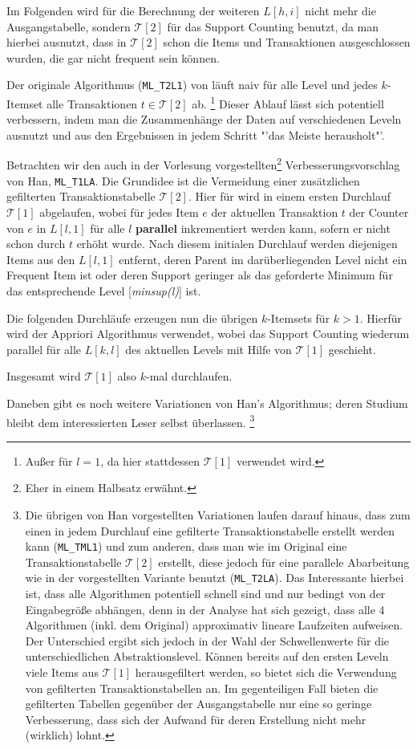 Im Folgenden wird für die Berechnung der weiteren \(L[h,i]\) nicht mehr die
Ausgangstabelle, sondern \(\mathcal{T}[2]\) für das Support Counting benutzt, da
man hierbei ausnutzt, dass in \(\mathcal{T}[2]\) schon die Items und Transaktionen
ausgeschlossen wurden, die gar nicht frequent sein können.

Der originale Algorithmus (\texttt{ML\_T2L1}) von \citet{Han95} läuft naiv für
alle Level und jedes \(k\)-Itemset alle Transaktionen \(t \in \mathcal{T}[2]\) ab.
\footnote{Außer für \(l=1\), da hier stattdessen \(\mathcal{T}[1]\) verwendet wird.}
Dieser Ablauf lässt sich potentiell  verbessern, indem man die Zusammenhänge der
Daten auf verschiedenen Leveln ausnutzt und aus den Ergebnissen in jedem Schritt
"'das Meiste herausholt"'.

Betrachten wir den auch in der Vorlesung vorgestellten\footnote{Eher in einem Halbsatz
erwähnt.} Verbesserungsvorschlag von Han, 
\texttt{ML\_T1LA}. Die Grundidee ist die Vermeidung einer zusätzlichen gefilterten
Transaktionstabelle \(\mathcal{T}[2]\). Hier für wird in einem ersten Durchlauf
\(\mathcal{T}[1]\) abgelaufen, wobei für jedes Item \(e\) der aktuellen Transaktion
\(t\) der Counter von \(e\) in \(L[l,1]\) für alle \(l\) \textbf{parallel}
inkrementiert werden kann, sofern er nicht schon durch \(t\) erhöht wurde.
Nach diesem initialen Durchlauf werden diejenigen Items aus den \(L[l,1]\) entfernt,
deren Parent im darüberliegenden Level nicht ein Frequent Item ist oder deren
Support geringer als das geforderte Minimum für das entsprechende Level 
[\textit{minsup(l)}] ist.

Die folgenden Durchläufe erzeugen nun die übrigen \(k\)-Itemsets für {\(k>1\)}.
Hierfür wird der Appriori Algorithmus verwendet, wobei das Support Counting 
wiederum parallel für alle \(L[k,l]\) des aktuellen Levels mit Hilfe von
\(\mathcal{T}[1]\) geschieht.

Insgesamt wird \(\mathcal{T}[1]\) also \(k\)-mal durchlaufen.

Daneben gibt es noch weitere Variationen von Han's Algorithmus; deren Studium
bleibt dem interessierten Leser selbst überlassen.
\footnote{Die übrigen von Han vorgestellten Variationen laufen darauf hinaus,
dass zum einen in jedem Durchlauf eine gefilterte Transaktionstabelle erstellt
werden kann (\texttt{ML\_TML1}) und zum anderen, 
dass man wie im Original eine Transaktionstabelle
\(\mathcal{T}[2]\) erstellt, diese jedoch für eine parallele Abarbeitung wie in
der vorgestellten Variante benutzt (\texttt{ML\_T2LA}). Das Interessante hierbei ist,
dass alle Algorithmen potentiell schnell sind und nur bedingt von der Eingabegröße
abhängen, denn in der Analyse hat sich gezeigt, dass alle 4 Algorithmen (inkl. dem
Original) approximativ lineare Laufzeiten aufweisen. Der Unterschied ergibt sich
jedoch in der Wahl der Schwellenwerte für die unterschiedlichen Abstraktionslevel.
Können bereits auf den ersten Leveln viele Items aus \(\mathcal{T}[1]\) herausgefiltert
werden, so bietet sich die Verwendung von gefilterten Transaktionstabellen an.
Im gegenteiligen Fall bieten die gefilterten Tabellen gegenüber der Ausgangstabelle
nur eine so geringe Verbesserung, dass sich der Aufwand für deren Erstellung nicht
mehr (wirklich) lohnt.}


